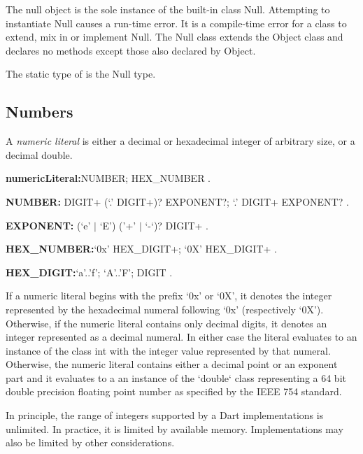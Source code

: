 \documentclass{article}
\newcommand{\code}[1]{{\sf #1}}
\begin{document}
\LMHash{}
The null object is the sole instance of the built-in class \code{Null}. Attempting to instantiate \code{Null} causes a run-time error. It is a compile-time error for a class to extend, mix in or implement \code{Null}.
The \code{Null} class extends the \code{Object} class and declares no methods except those also declared by \code{Object}.

\LMHash{}
The static type of \NULL{} is the \code{Null} type.


\subsection{Numbers}

\LMHash{}
A {\em numeric literal} is either a decimal or hexadecimal integer of arbitrary size, or a decimal double.

\begin{grammar}
{\bf numericLiteral:}NUMBER;
      HEX\_NUMBER
    .

  {\bf NUMBER:} DIGIT+ (`{\escapegrammar.}' DIGIT+)? EXPONENT?;
      {`\escapegrammar .}' DIGIT+ EXPONENT?
    .

{\bf  EXPONENT:}
      (`e' $|$ `E') ('+' $|$ `-`)? DIGIT+
    .

{\bf HEX\_NUMBER:}`0x' HEX\_DIGIT+;
      `0X' HEX\_DIGIT+
    .

 {\bf HEX\_DIGIT:}`a'{\escapegrammar ..}'f';
      `A'{\escapegrammar ..}'F';
      DIGIT
    .
 \end{grammar}

\LMHash{}
If a numeric literal begins with the prefix `0x' or `0X',
it denotes the integer represented by the hexadecimal numeral
following `0x' (respectively `0X').
Otherwise, if the numeric literal contains only decimal digits,
it denotes an integer represented as a decimal numeral.
In either case the literal evaluates to an instance of the class \code{int}
with the integer value represented by that numeral.
Otherwise, the numeric literal contains either a decimal point or an exponent part
and it evaluates to a an instance of the `double` class
representing a 64 bit double precision floating point number
as specified by the IEEE 754 standard.

\LMHash{}
In principle, the range of integers supported by a Dart implementations is unlimited. In practice, it is limited by available memory. Implementations may also be limited by other considerations.

\end{document}
